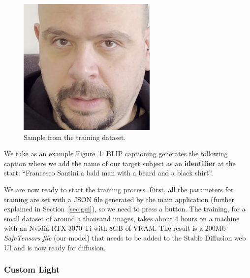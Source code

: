 \documentclass[preprint]{elsarticle}
\begin{document}
\begin{figure}[t]
	\centering
	\includegraphics[scale=0.3, keepaspectratio]{img/project_img/santini-training.png}
	\caption{Sample from the training dataset.}
	\label{fig:santini-training}
\end{figure}


We take as an example Figure~\ref{fig:santini-training}: BLIP captioning generates the following caption where we add the name of our target subject as an \textbf{identifier} at the start: ``Francesco Santini a bald man with a beard and a black shirt''.

We are now ready to start the training process.  First, all the parameters for training are set with a JSON file generated by the main application (further explained in Section~\ref{sec:gui}), so we need to press a button. The training, for a small dataset of around a thousand images, 
takes about $4$ hours on a machine with an Nvidia RTX 3070 Ti with $8$GB of VRAM.  The result is a $200$Mb \emph{SafeTensors file} (our model) that needs to be added to the Stable Diffusion web UI and is now ready for diffusion.

\subsubsection{Custom Light}
\end{document}

